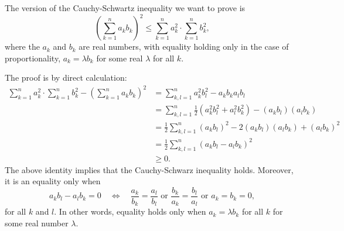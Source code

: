 \documentclass[12pt]{article}
\begin{document}
The version of the Cauchy-Schwartz inequality we want to prove is
\[
  \left(\sum_{k=1}^n a_k b_k \right)^2 \le
    \sum_{k=1}^n a_k^2 \cdot \sum_{k=1}^n b_k^2,
\]
where the $a_k$ and $b_k$ are real numbers, with equality holding only in the
case of proportionality, $a_k=\lambda b_k$ for some real $\lambda$ for all $k$.

The proof is by direct calculation:
\begin{align*}
	\sum_{k=1}^n a_k^2 \cdot \sum_{k=1}^n b_k^2 -
		\left(\sum_{k=1}^n a_k b_k \right)^2
	&= \sum_{k,l=1}^n a_k^2 b_l^2 - a_k b_k a_l b_l \\
	&= \sum_{k,l=1}^n \frac{1}{2}(a_k^2 b_l^2 + a_l^2 b_k^2) - (a_k b_l)(a_l b_k) \\
	&= \frac{1}{2}\sum_{k,l=1}^n (a_k b_l)^2 - 2(a_k b_l)(a_l b_k) + (a_l b_k)^2 \\
	&= \frac{1}{2}\sum_{k,l=1}^n (a_k b_l - a_l b_k)^2 \\
	&\ge 0 .
\end{align*}
The above identity implies that the Cauchy-Schwarz inequality holds.
Moreover, it is an equality only when
\[
  a_k b_l - a_l b_k = 0 \quad \Longleftrightarrow \quad
  \frac{a_k}{b_k} = \frac{a_l}{b_l}  \text{ or }
  \frac{b_k}{a_k} = \frac{b_l}{a_l}  \text{ or }
  a_k = b_k = 0,
\]
for all $k$ and $l$. In other words, equality holds only when $a_k = \lambda b_k$ for all $k$ for some real number $\lambda$.
\end{document}
